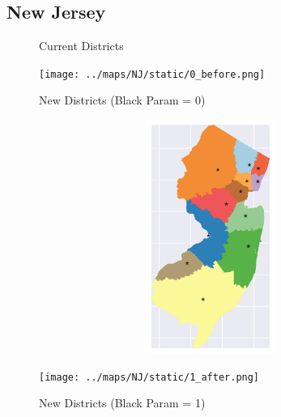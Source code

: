 \subsection{New Jersey}
\begin{figure}[htb!] \centering
\caption{ Current Districts }
\texttt{[image: ../maps/NJ/static/0\_before.png]}
\caption{ New Districts (Black Param = 0) }
\includegraphics[width=5in,height=3in,keepaspectratio]{../maps/NJ/static/0_after.png}
\caption{ New Districts (Black Param = 1) }
\texttt{[image: ../maps/NJ/static/1\_after.png]}
\end{figure}

\clearpage
\newpage

